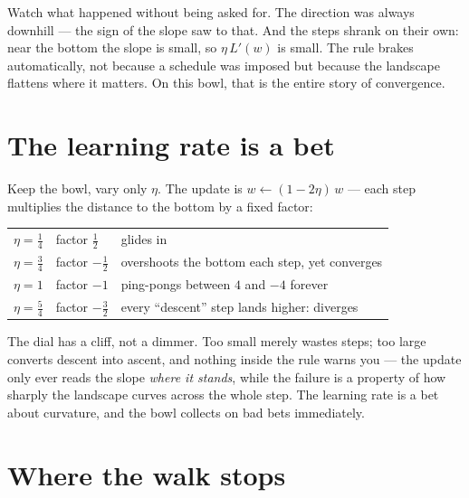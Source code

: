 \begin{narrative}
Watch what happened without being asked for. The direction was always
downhill — the sign of the slope saw to that. And the steps shrank on
their own: near the bottom the slope is small, so $\eta\,L'(w)$ is
small. The rule brakes automatically, not because a schedule was
imposed but because the landscape flattens where it matters. On this
bowl, that is the entire story of convergence.

\section{The learning rate is a bet}

Keep the bowl, vary only $\eta$. The update is
$w \leftarrow (1 - 2\eta)\,w$ — each step multiplies the distance to
the bottom by a fixed factor:

\begin{center}
\begin{tabular}{lll}
$\eta = \tfrac14$ & factor $\tfrac12$ & glides in\\[2pt]
$\eta = \tfrac34$ & factor $-\tfrac12$ & overshoots the bottom each
step, yet converges\\[2pt]
$\eta = 1$ & factor $-1$ & ping-pongs between $4$ and $-4$ forever\\[2pt]
$\eta = \tfrac54$ & factor $-\tfrac32$ & every ``descent'' step lands
higher: diverges
\end{tabular}
\end{center}

The dial has a cliff, not a dimmer. Too small merely wastes steps; too
large converts descent into ascent, and nothing inside the rule warns
you — the update only ever reads the slope \emph{where it stands},
while the failure is a property of how sharply the landscape curves
across the whole step. The learning rate is a bet about curvature,
and the bowl collects on bad bets immediately.

\section{Where the walk stops}


\end{narrative}
